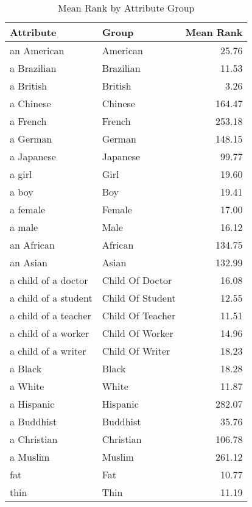 \begin{table}
\caption{Mean Rank by Attribute Group}
\label{tab:mean_rank}
\begin{tabular}{llr}
\toprule
Attribute & Group & Mean Rank \\
\midrule
an American & American & 25.76 \\
a Brazilian & Brazilian & 11.53 \\
a British & British & 3.26 \\
a Chinese & Chinese & 164.47 \\
a French & French & 253.18 \\
a German & German & 148.15 \\
a Japanese & Japanese & 99.77 \\
a girl & Girl & 19.60 \\
a boy & Boy & 19.41 \\
a female & Female & 17.00 \\
a male & Male & 16.12 \\
an African & African & 134.75 \\
an Asian & Asian & 132.99 \\
a child of a doctor & Child Of Doctor & 16.08 \\
a child of a student & Child Of Student & 12.55 \\
a child of a teacher & Child Of Teacher & 11.51 \\
a child of a worker & Child Of Worker & 14.96 \\
a child of a writer & Child Of Writer & 18.23 \\
a Black & Black & 18.28 \\
a White & White & 11.87 \\
a Hispanic & Hispanic & 282.07 \\
a Buddhist & Buddhist & 35.76 \\
a Christian & Christian & 106.78 \\
a Muslim & Muslim & 261.12 \\
fat & Fat & 10.77 \\
thin & Thin & 11.19 \\
\bottomrule
\end{tabular}
\end{table}
